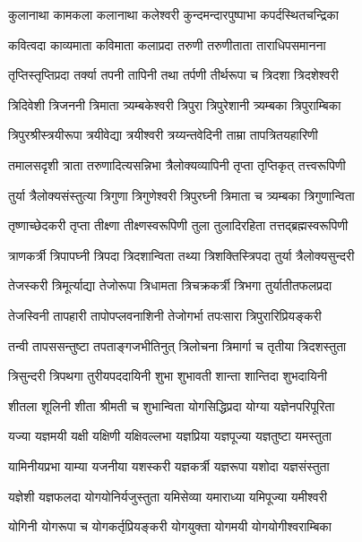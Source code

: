 \twolineshloka
{कुलानाथा कामकला कलानाथा कलेश्वरी}
{कुन्दमन्दारपुष्पाभा कपर्दस्थितचन्द्रिका}%

\twolineshloka
{कवित्वदा काव्यमाता कविमाता कलाप्रदा}
{तरुणी तरुणीताता ताराधिपसमानना}%

\twolineshloka
{तृप्तिस्तृप्तिप्रदा तर्क्या तपनी तापिनी तथा}
{तर्पणी तीर्थरूपा च त्रिदशा त्रिदशेश्वरी}%

\twolineshloka
{त्रिदिवेशी त्रिजननी त्रिमाता त्र्यम्बकेश्वरी}
{त्रिपुरा त्रिपुरेशानी त्र्यम्बका त्रिपुराम्बिका}%

\twolineshloka
{त्रिपुरश्रीस्त्रयीरूपा त्रयीवेद्या त्रयीश्वरी}
{त्रय्यन्तवेदिनी ताम्रा तापत्रितयहारिणी}%

\twolineshloka
{तमालसदृशी त्राता तरुणादित्यसन्निभा}
{त्रैलोक्यव्यापिनी तृप्ता तृप्तिकृत् तत्त्वरूपिणी}%

\twolineshloka
{तुर्या त्रैलोक्यसंस्तुत्या त्रिगुणा त्रिगुणेश्वरी}
{त्रिपुरघ्नी त्रिमाता च त्र्यम्बका त्रिगुणान्विता}%

\twolineshloka
{तृष्णाच्छेदकरी तृप्ता तीक्ष्णा तीक्ष्णस्वरूपिणी}
{तुला तुलादिरहिता तत्तद्ब्रह्मस्वरूपिणी}%

\twolineshloka
{त्राणकर्त्री त्रिपापघ्नी त्रिपदा त्रिदशान्विता}
{तथ्या त्रिशक्तिस्त्रिपदा तुर्या त्रैलोक्यसुन्दरी}%

\twolineshloka
{तेजस्करी त्रिमूर्त्याद्या तेजोरूपा त्रिधामता}
{त्रिचक्रकर्त्री त्रिभगा तुर्यातीतफलप्रदा}%

\twolineshloka
{तेजस्विनी तापहारी तापोपप्लवनाशिनी}
{तेजोगर्भा तपःसारा त्रिपुरारिप्रियङ्करी}%

\twolineshloka
{तन्वी तापससन्तुष्टा तपताङ्गजभीतिनुत्}
{त्रिलोचना त्रिमार्गा च तृतीया त्रिदशस्तुता}%

\twolineshloka
{त्रिसुन्दरी त्रिपथगा तुरीयपददायिनी}
{शुभा शुभावती शान्ता शान्तिदा शुभदायिनी}%

\twolineshloka
{शीतला शूलिनी शीता श्रीमती च शुभान्विता}
{योगसिद्धिप्रदा योग्या यज्ञेनपरिपूरिता}%

\twolineshloka
{यज्या यज्ञमयी यक्षी यक्षिणी यक्षिवल्लभा}
{यज्ञप्रिया यज्ञपूज्या यज्ञतुष्टा यमस्तुता}%

\twolineshloka
{यामिनीयप्रभा याम्या यजनीया यशस्करी}
{यज्ञकर्त्री यज्ञरूपा यशोदा यज्ञसंस्तुता}%

\twolineshloka
{यज्ञेशी यज्ञफलदा योगयोनिर्यजुस्तुता}
{यमिसेव्या यमाराध्या यमिपूज्या यमीश्वरी}%

\twolineshloka
{योगिनी योगरूपा च योगकर्तृप्रियङ्करी}
{योगयुक्ता योगमयी योगयोगीश्वराम्बिका}%

